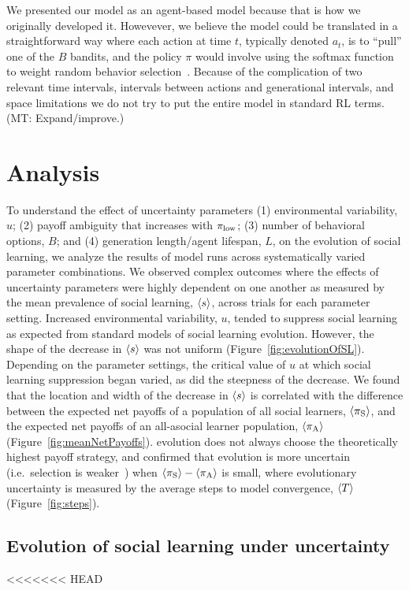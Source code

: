 \documentclass[letterpaper,11.5pt]{scrartcl}
\newcommand{\mt}[1]{{\textcolor{myorange} {({\tiny MT:} #1)}}}
\begin{document}
We presented our model as an agent-based model because that is
how we originally developed it. Howevever, we believe the model could be 
translated in a straightforward way where each action at time $t$, typically denoted
$a_t$, is to ``pull'' one of the $B$ bandits, and the policy $\pi$ would 
involve using the softmax function to weight random behavior
selection~\cite{SuttonBartoBook}. Because of the complication of two
relevant time intervals, intervals between actions and generational intervals, and
space limitations we do not try to put the entire model in standard RL terms.
\mt{Expand/improve.}

\section{Analysis}

To understand the effect of uncertainty parameters (1) environmental variability, $u$; (2) payoff
ambiguity that increases with $\pi_{\mathrm{low}}$; (3) number of behavioral options, $B$; and 
(4) generation length/agent lifespan, $L$, on the evolution of social learning, we analyze the results of
model runs across systematically varied parameter combinations.  We observed complex
outcomes where the effects of uncertainty parameters were highly dependent on one
another as measured by the mean prevalence of social learning, $\langle s \rangle$, across
trials for each parameter setting.  Increased environmental variability, $u$, 
tended to suppress social learning as expected from standard models of
social learning evolution. However, the shape of the decrease in $\langle s \rangle$ 
was not uniform (Figure~\ref{fig:evolutionOfSL}). 
Depending on the parameter settings, the critical value of $u$ at which social 
learning suppression began varied, as did the steepness of the decrease. 
We found that the location and width of the decrease in $\langle s \rangle$ is correlated
with the difference between the expected net payoffs of a population of all
social learners, $\langle \pi_\mathrm{S} \rangle$, and the expected net payoffs
of an all-asocial learner population, $\langle \pi_\mathrm{A} \rangle$ (Figure~\ref{fig:meanNetPayoffs}). 
evolution does not always choose the theoretically highest payoff strategy,
and confirmed that evolution is more uncertain (i.e.\ selection is
weaker~\cite[p. 103]{BoydRicherson1985}) when $\langle \pi_\mathrm{S} \rangle - \langle \pi_\mathrm{A} \rangle$ is small, 
where evolutionary uncertainty is measured by the 
average steps to model convergence, $\langle T \rangle$ (Figure~\ref{fig:steps}).

\subsection{Evolution of social learning under uncertainty}
<<<<<<< HEAD
\end{document}
